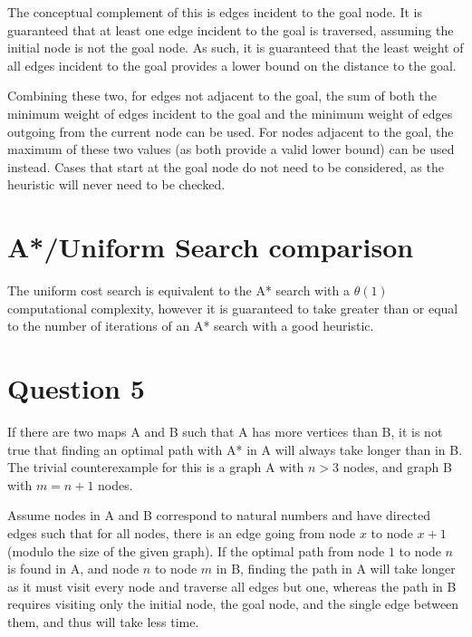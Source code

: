 \documentclass[11pt,a4paper]{article}
\begin{document}
The conceptual complement of this is edges incident to the goal node. It is guaranteed that at least one edge incident to the goal is traversed, assuming the initial node is not the goal node. As such, it is guaranteed that the least weight of all edges incident to the goal provides a lower bound on the distance to the goal.

Combining these two, for edges not adjacent to the goal, the sum of both the minimum weight of edges incident to the goal and the minimum weight of edges outgoing from the current node can be used. For nodes adjacent to the goal, the maximum of these two values (as both provide a valid lower bound) can be used instead. Cases that start at the goal node do not need to be considered, as the heuristic will never need to be checked.


\section{A*/Uniform Search comparison}

The uniform cost search is equivalent to the A* search with a \(\theta(1)\) computational complexity, however it is guaranteed to take greater than or equal to the number of iterations of an A* search with a good heuristic.


\section{Question 5}
If there are two maps A and B such that A has more vertices than B, it is not true that finding an optimal path with A* in A will always take longer than in B. The trivial counterexample for this is a graph A with \(n > 3\) nodes, and graph B with \(m = n + 1\) nodes.

Assume nodes in A and B correspond to natural numbers and have directed edges such that for all nodes, there is an edge going from node \(x\) to node \(x+1\) (modulo the size of the given graph). If the optimal path from node \(1\) to node \(n\) is found in A, and node \(n\) to node \(m\) in B, finding the path in A will take longer as it must visit every node and traverse all edges but one, whereas the path in B requires visiting only the initial node, the goal node, and the single edge between them, and thus will take less time.
\end{document}
